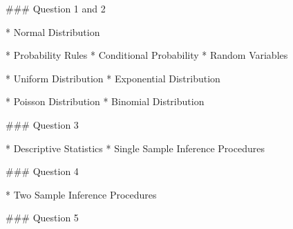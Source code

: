
### Question 1 and 2

* Normal Distribution

* Probability Rules
* Conditional Probability
* Random Variables  

* Uniform Distribution
* Exponential Distribution

* Poisson Distribution
* Binomial Distribution

### Question 3

* Descriptive Statistics
* Single Sample Inference Procedures

### Question 4

* Two Sample Inference Procedures

### Question 5

